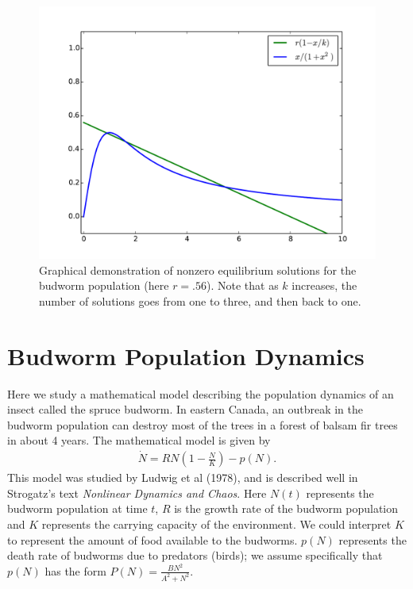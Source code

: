 \begin{figure}
\centering
\includegraphics[width=\textwidth]{BudwormEquilibria.pdf}
\caption{Graphical demonstration of nonzero equilibrium solutions for the budworm population (here $r = .56$).
Note that as $k$ increases, the number of solutions goes from one to three, and then back to one. }
\label{equilibria:budworm}
\end{figure}

\section{Budworm Population Dynamics}
Here we study a mathematical model describing the population dynamics of an insect called the spruce budworm.
In eastern Canada, an outbreak in the budworm population can destroy most of the trees in a forest of balsam fir trees in about 4 years.
The mathematical model is given by 
\begin{align}
\dot{N} = RN\left(1 - \frac{N}{K}\right) - p(N). \label{budworm1}
\end{align}
This model was studied by Ludwig et al (1978), and is described well in Strogatz's text \emph{Nonlinear Dynamics and Chaos}.
Here $N(t)$ represents the budworm population at time $t$, $R$ is the growth rate of the budworm population and $K$ represents the carrying capacity of the environment.
We could interpret $K$ to represent the amount of food available to the budworms. 
$p(N)$ represents the death rate of budworms due to predators (birds); we assume specifically that $p(N)$ has the form $P(N) = \frac{BN^2}{A^2 + N^2}$.

